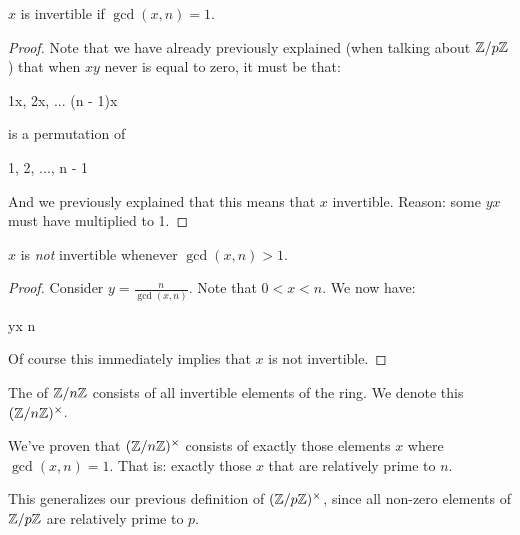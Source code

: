 \begin{theorem}
  $x$ is invertible if $\gcd(x, n) = 1$.
\end{theorem}

\begin{proof}
  Note that we have already previously explained (when talking about
  $\mathbb{Z} / p\mathbb{Z}$) that when $xy$ never is equal to zero, it must be that:

  \begin{nedqn}
    1x, 2x, ... (n - 1)x
  \end{nedqn}

  \noindent
  is a permutation of

  \begin{nedqn}
    1, 2, ..., n - 1
  \end{nedqn}

  \noindent
  And we previously explained that this means that $x$ invertible.
  Reason: some $yx$ must have multiplied to 1.
\end{proof}

\begin{theorem}
  $x$ is \emph{not} invertible whenever $\gcd(x, n) > 1$.
\end{theorem}

\begin{proof}
  Consider $y = \frac{n}{\gcd(x, n)}$. Note that $0 < x < n$. We now
  have:

  \begin{nedqn}
    yx
  \equivcol
    n
  \\
   
  \end{nedqn}

  Of course this immediately implies that $x$ is not invertible.
\end{proof}

\begin{definition}
  The  of $\mathbb{Z} / n\mathbb{Z}$ consists of all
  invertible elements of the ring. We denote this $\mathopen{}\left( {\mathbb{Z} / n\mathbb{Z}} \right)\mathclose{}^\times$.
\end{definition}

\begin{remark}
  We've proven that $\mathopen{}\left( {\mathbb{Z} / n\mathbb{Z}} \right)\mathclose{}^\times$ consists of exactly those elements $x$
  where $\gcd(x, n) = 1$. That is: exactly those $x$ that are relatively
  prime to $n$.

  This generalizes our previous definition of $\mathopen{}\left( {\mathbb{Z} / p\mathbb{Z}} \right)\mathclose{}^\times$, since all
  non-zero elements of $\mathbb{Z} / p\mathbb{Z}$ are relatively prime to $p$.
\end{remark}
